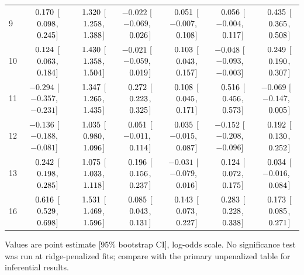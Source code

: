 \begin{table}[htbp]
{\begin{tabular}{lcccccc}
9 & $\hphantom{-}0.170$ [$\hphantom{-}0.098$, $\hphantom{-}0.245$] & $\hphantom{-}1.320$ [$\hphantom{-}1.258$, $\hphantom{-}1.388$] & $-0.022$ [$-0.069$, $\hphantom{-}0.026$] & $\hphantom{-}0.051$ [$-0.007$, $\hphantom{-}0.108$] & $\hphantom{-}0.056$ [$-0.004$, $\hphantom{-}0.117$] & $\hphantom{-}0.435$ [$\hphantom{-}0.365$, $\hphantom{-}0.508$] \\
10 & $\hphantom{-}0.124$ [$\hphantom{-}0.063$, $\hphantom{-}0.184$] & $\hphantom{-}1.430$ [$\hphantom{-}1.358$, $\hphantom{-}1.504$] & $-0.021$ [$-0.059$, $\hphantom{-}0.019$] & $\hphantom{-}0.103$ [$\hphantom{-}0.043$, $\hphantom{-}0.157$] & $-0.048$ [$-0.093$, $-0.003$] & $\hphantom{-}0.249$ [$\hphantom{-}0.190$, $\hphantom{-}0.307$] \\
11 & $-0.294$ [$-0.357$, $-0.231$] & $\hphantom{-}1.347$ [$\hphantom{-}1.265$, $\hphantom{-}1.435$] & $\hphantom{-}0.272$ [$\hphantom{-}0.223$, $\hphantom{-}0.325$] & $\hphantom{-}0.108$ [$\hphantom{-}0.045$, $\hphantom{-}0.171$] & $\hphantom{-}0.516$ [$\hphantom{-}0.456$, $\hphantom{-}0.573$] & $-0.069$ [$-0.147$, $\hphantom{-}0.005$] \\
12 & $-0.136$ [$-0.188$, $-0.081$] & $\hphantom{-}1.035$ [$\hphantom{-}0.980$, $\hphantom{-}1.096$] & $\hphantom{-}0.051$ [$-0.011$, $\hphantom{-}0.114$] & $\hphantom{-}0.035$ [$-0.015$, $\hphantom{-}0.087$] & $-0.152$ [$-0.208$, $-0.096$] & $\hphantom{-}0.192$ [$\hphantom{-}0.130$, $\hphantom{-}0.252$] \\
13 & $\hphantom{-}0.242$ [$\hphantom{-}0.198$, $\hphantom{-}0.285$] & $\hphantom{-}1.075$ [$\hphantom{-}1.033$, $\hphantom{-}1.118$] & $\hphantom{-}0.196$ [$\hphantom{-}0.156$, $\hphantom{-}0.237$] & $-0.031$ [$-0.079$, $\hphantom{-}0.016$] & $\hphantom{-}0.124$ [$\hphantom{-}0.072$, $\hphantom{-}0.175$] & $\hphantom{-}0.034$ [$-0.016$, $\hphantom{-}0.084$] \\
16 & $\hphantom{-}0.616$ [$\hphantom{-}0.529$, $\hphantom{-}0.698$] & $\hphantom{-}1.531$ [$\hphantom{-}1.469$, $\hphantom{-}1.596$] & $\hphantom{-}0.085$ [$\hphantom{-}0.043$, $\hphantom{-}0.131$] & $\hphantom{-}0.143$ [$\hphantom{-}0.073$, $\hphantom{-}0.227$] & $\hphantom{-}0.283$ [$\hphantom{-}0.228$, $\hphantom{-}0.338$] & $\hphantom{-}0.173$ [$\hphantom{-}0.085$, $\hphantom{-}0.271$] \\
\bottomrule
\end{tabular}
}
\vspace{4pt}
\par\noindent
\begin{minipage}{\linewidth}\small Values are point estimate [95\% bootstrap CI], log-odds scale. No significance test was run at ridge-penalized fits; compare with the primary unpenalized table for inferential results.\end{minipage}
\end{table}